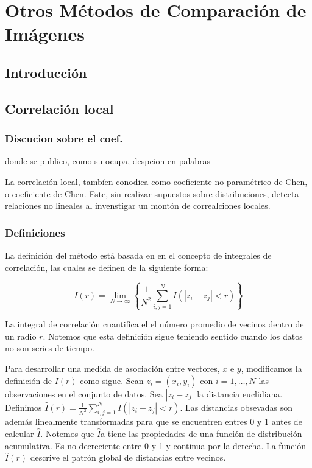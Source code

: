 \chapter{Otros Métodos de Comparación de Imágenes}\label{chap4}


\section{Introducci\'on}

\section[]{Correlaci\'on local} 


	\subsection{Discucion sobre el coef.}

	donde se publico, como su ocupa, despcion en palabras

	La correlaci\'on local, tamb\'ien conodica como coeficiente no param\'etrico de Chen, o coeficiente de Chen. Este, sin realizar supuestos sobre distribuciones, detecta relaciones no lineales al invenstigar un mont\'on de correalciones locales. 

	\subsection{Definiciones}

	La definici\'on del m\'etodo est\'a basada en en el concepto de integrales de correlaci\'on, las cuales se definen de la siguiente forma:
	\begin{defn}
		$$
		I(r)=\lim _{N \rightarrow \infty}\left\{\frac{1}{N^{2}} \sum_{i, j=1}^{N} I\left(\left|z_{i}-z_{j}\right|<r\right)\right\}
		$$
	\end{defn}
	La integral de correlaci\'on cuantifica el el n\'umero promedio de vecinos dentro de un radio $r$. Notemos que esta definici\'on sigue teniendo sentido cuando los datos no son series de tiempo.

	Para desarrollar una medida de asociaci\'on entre vectores, $x$ e $y$, modificamos la definici\'on de $I(r)$ como sigue. Sean $z_i=(x_i,y_i)$ con $i=1,\dots, N$ las observaciones en el conjunto de datos. Sea $|z_i-z_j|$ la distancia euclidiana. Definimos $\hat{I}(r)=\frac{1}{N^{2}} \sum_{i, j=1}^{N} I\left(\left|z_{i}-z_{j}\right|<r\right)$. Las distancias obsevadas son adem\'as linealmente transformadas para que se encuentren entres 0 y 1 antes de calcular $\hat{I}$. Notemos que $\hat{I}$a tiene las propiedades de una funci\'on de distribuci\'on acumulativa. Es no decreciente entre 0 y 1 y continua por la derecha. La funci\'on $\hat{I}(r)$ descrive el patr\'on global de distancias entre vecinos. 

